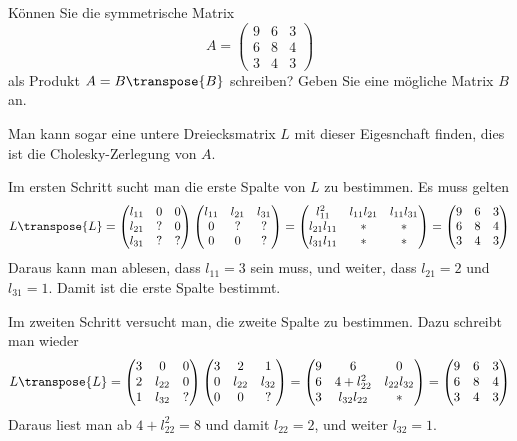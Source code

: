 Können Sie die symmetrische Matrix
\[
A=\begin{pmatrix}
9&6&3\\
6&8&4\\
3&4&3
\end{pmatrix}
\]
als Produkt $A=B\transpose{B}$ schreiben? Geben Sie eine mögliche Matrix $B$ an.


\begin{loesung}
Man kann sogar eine untere Dreiecksmatrix $L$ mit dieser Eigesnchaft finden,
dies ist die Cholesky-Zerlegung von $A$.

Im ersten Schritt sucht man die erste Spalte von $L$ zu bestimmen.
Es muss gelten
\[
L\transpose{L}=
\begin{pmatrix}
l_{11}&  0&  0\\
l_{21}&  ?&  0\\
l_{31}&  ?&  ?
\end{pmatrix}
\begin{pmatrix}
l_{11}&l_{21}&l_{31}\\
     0&     ?&     ?\\
     0&     0&     ?
\end{pmatrix}
=
\begin{pmatrix}
    l_{11}^2&l_{11}l_{21}&l_{11}l_{31}\\
l_{21}l_{11}&           *&           *\\
l_{31}l_{11}&           *&           *
\end{pmatrix}
=
\begin{pmatrix}
9&6&3\\
6&8&4\\
3&4&3
\end{pmatrix}
\]
Daraus kann man ablesen, dass $l_{11}=3$ sein muss, und weiter,
dass
$l_{21}=2$ und $l_{31}=1$. Damit ist die erste Spalte bestimmt.

Im zweiten Schritt versucht man, die zweite Spalte zu bestimmen.
Dazu schreibt man wieder
\[
L\transpose{L}
=
\begin{pmatrix}
3&     0&0\\
2&l_{22}&0\\
1&l_{32}&?
\end{pmatrix}
\begin{pmatrix}
3&     2&     1\\
0&l_{22}&l_{32}\\
0&     0&?
\end{pmatrix}
=
\begin{pmatrix}
9&6           &           0\\
6&4+l_{22}^2  &l_{22}l_{32}\\
3&l_{32}l_{22}&         *
\end{pmatrix}
=
\begin{pmatrix}
9&6&3\\
6&8&4\\
3&4&3
\end{pmatrix}
\]
Daraus liest man ab $4+l_{22}^2=8$ und damit $l_{22}=2$, und weiter
$l_{32}=1$.


\end{loesung}
